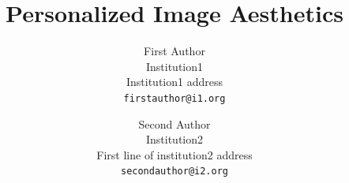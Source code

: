 \documentclass[10pt,twocolumn,letterpaper]{article}
\begin{document}
\title{Personalized Image Aesthetics}

\author{First Author\\
Institution1\\
Institution1 address\\
{\tt\small firstauthor@i1.org}
\and
Second Author\\
Institution2\\
First line of institution2 address\\
{\tt\small secondauthor@i2.org}
}

\maketitle
\end{document}
